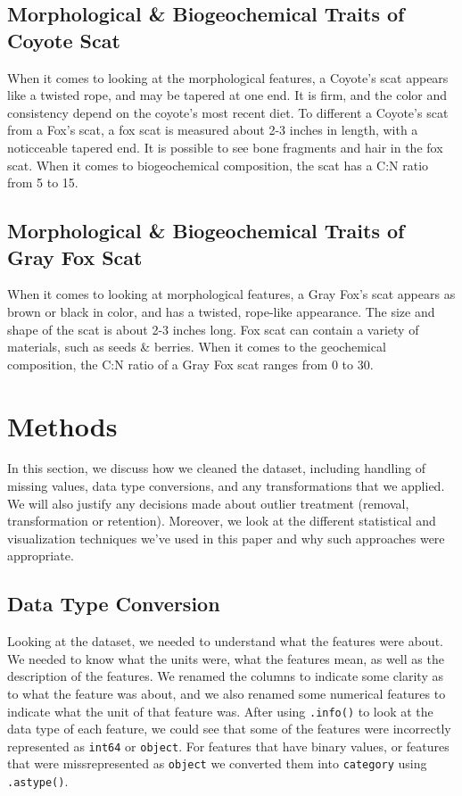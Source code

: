 \documentclass[a4paper]{article}
\begin{document}
\subsection{Morphological \& Biogeochemical Traits of Coyote Scat}
When it comes to looking at the morphological features, a Coyote's scat appears like a twisted rope, and may be tapered at one end. It is firm, and the color
and consistency depend on the coyote's most recent diet. To different a Coyote's scat from a Fox's scat, a fox scat is measured about 2-3 inches in length,
with a noticceable tapered end. It is possible to see bone fragments and hair in the fox scat.  When it comes to biogeochemical composition, the scat has a 
C:N ratio from 5 to 15.

\subsection{Morphological \& Biogeochemical Traits of Gray Fox Scat}
When it comes to looking at morphological features, a Gray Fox's scat appears as brown or black in color, and has a twisted, rope-like appearance. The size 
and shape of the scat is about 2-3 inches long. Fox scat can contain a variety of materials, such as seeds \& berries. When it comes to the geochemical
composition, the C:N ratio of a Gray Fox scat ranges from 0 to 30. 

\newpage

\section{Methods}
In this section, we discuss how we cleaned the dataset, including handling of missing values, data type conversions, and any transformations that we applied.
We will also justify any decisions made about outlier treatment (removal, transformation or retention). Moreover, we look at the different statistical and
visualization techniques we've used in this paper and why such approaches were appropriate.

\subsection{Data Type Conversion}
Looking at the dataset, we needed to understand what the features were about. We needed to know what the units were, what the features mean, as well as the 
description of the features. We renamed the columns to indicate some clarity as to what the feature was about, and we also renamed some numerical features
to indicate what the unit of that feature was. After using \texttt{.info()} to look at the data type of each feature, we could see that some of the features
were incorrectly represented as \texttt{int64} or \texttt{object}. For features that have binary values, or features that were missrepresented as 
\texttt{object} we converted them into \texttt{category} using \texttt{.astype()}.
\end{document}
